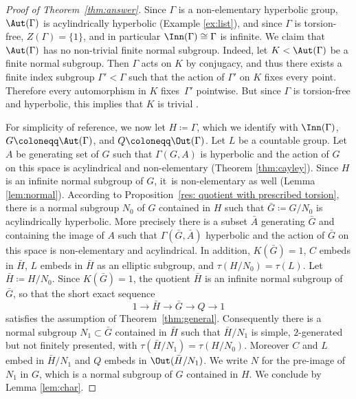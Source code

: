 \begin{proof}[Proof of Theorem~\ref{thm:answer}]
Since $\Gamma$ is a non-elementary hyperbolic group, $\Aut(\Gamma)$ is acylindrically hyperbolic (Example \ref{ex:list}), and since $\Gamma$ is torsion-free, $Z(\Gamma) = \{ 1 \}$, and in particular $\Inn(\Gamma) \cong \Gamma$ is infinite. We claim that $\Aut(\Gamma)$ has no non-trivial finite normal subgroup. Indeed, let $K < \Aut(\Gamma)$ be a finite normal subgroup. Then $\Gamma$ acts on $K$ by conjugacy, and thus there exists a finite index subgroup $\Gamma' < \Gamma$ such that the action of $\Gamma'$ on $K$ fixes every point. Therefore every automorphism in $K$ fixes~$\Gamma'$ pointwise. But since $\Gamma$ is torsion-free and hyperbolic, this implies that $K$ is trivial \cite[Lem.\,2.2 \& 2.3]{root}.

For simplicity of reference, we now let $H \coloneqq \Gamma$, which we identify with $\Inn(\Gamma)$, $G \coloneqq \Aut(\Gamma)$, and $Q \coloneqq \Out(\Gamma)$.
Let $L$ be a countable group.
Let $A$ be generating set of $G$ such that $\Gamma(G,A)$ is hyperbolic and the action of $G$ on this space is acylindrical and non-elementary (Theorem \ref{thm:cayley}).
Since $H$ is an infinite normal subgroup of $G$, it~is non-elementary as well (Lemma \ref{lem:normal}).
According to Proposition~\ref{res: quotient with prescribed torsion}, there is a normal subgroup $N_0$ of $G$ contained in $H$ such that $\bar G \coloneqq G/N_0$ is acylindrically hyperbolic.
More precisely there is a subset $\bar A$ generating $\bar G$ and containing the image of $A$ such that $\Gamma(\bar G, \bar A)$ hyperbolic and the action of $\bar G$ on this space is non-elementary and acylindrical.
In addition, $K(\bar G) = 1$, $C$ embeds in $\bar H$, $L$ embeds in $\bar H$ as an elliptic subgroup, and $\tau(H/N_0) = \tau(L)$.
Let $\bar H \coloneqq H/N_0$.
Since $K(\bar G) = 1$, the quotient $\bar H$ is an infinite normal subgroup of $\bar G$, so that the short exact sequence
\begin{equation*}
1 \to \bar H \to \bar G \to Q \to 1
\end{equation*}
satisfies the assumption of Theorem~\ref{thm:general}.
Consequently there is a normal subgroup $N_1 \subset \bar G$ contained in $\bar H$ such that $\bar H/N_1$ is simple, $2$-generated but not finitely presented, with $\tau(\bar H/N_1) = \tau(H/N_0)$.
Moreover $C$ and $L$ embed in $\bar H/N_1$ and $Q$ embeds in $\Out(\bar H/N_1)$.
We write $N$ for the pre-image of $N_1$ in $G$,
which is a normal subgroup of $G$ contained in $H$.
We conclude by Lemma \ref{lem:char}.
\end{proof}

